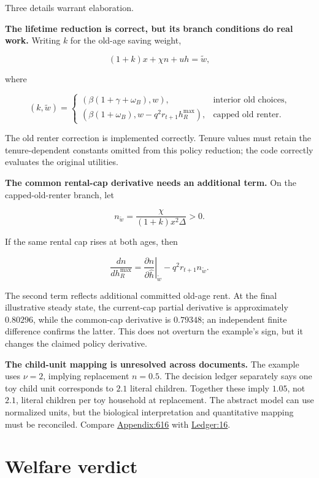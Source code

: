 \documentclass[11pt,letterpaper]{article}
\begin{document}
Three details warrant elaboration.

\textbf{The lifetime reduction is correct, but its branch conditions do real work.}
Writing \(k\) for the old-age saving weight,

\[
(1+k)x+\chi n+uh=\widetilde w,
\]

where

\[
(k,\widetilde w)=
\begin{cases}
(\beta(1+\gamma+\omega_B),w),&\text{interior old choices},\\
(\beta(1+\omega_B),w-q^2r_{t+1}h_R^{\max}),&\text{capped old renter}.
\end{cases}
\]

The old renter correction is implemented correctly. Tenure values must retain the
tenure-dependent constants omitted from this policy reduction; the code correctly
evaluates the original utilities.

\textbf{The common rental-cap derivative needs an additional term.} On the
capped-old-renter branch, let

\[
n_{\widetilde w}
=\frac{\chi}{(1+k)x^2\Delta}>0.
\]

If the same rental cap rises at both ages, then

\[
\frac{dn}{dh_R^{\max}}
=
\left.\frac{\partial n}{\partial\widehat h}\right|_{\widetilde w}
-q^2r_{t+1}n_{\widetilde w}.
\]

The second term reflects additional committed old-age rent. At the final illustrative
steady state, the current-cap partial derivative is approximately \(0.80296\), while the
common-cap derivative is \(0.79348\); an independent finite difference confirms the
latter. This does not overturn the example's sign, but it changes the claimed policy
derivative.

\textbf{The child-unit mapping is unresolved across documents.} The example uses
\(\nu=2\), implying replacement \(n=0.5\). The decision ledger separately says one toy
child unit corresponds to \(2.1\) literal children. Together these imply \(1.05\), not
\(2.1\), literal children per toy household at replacement. The abstract model can use
normalized units, but the biological interpretation and quantitative mapping must be
reconciled. Compare \hyperlink{source-appendix}{Appendix:616} with
\hyperlink{source-ledger}{Ledger:16}.

\section{Welfare verdict}\label{welfare-verdict}
\end{document}
